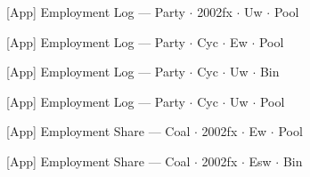 \documentclass[aspectratio=169,10pt]{beamer}
\newcommand{\tabledir}{../tables/firm}
\begin{document}
\begin{frame}[t,shrink=5]{[App] Employment Log --- Party $\cdot$ 2002fx $\cdot$ Uw $\cdot$ Pool}
\begin{center}\footnotesize

\end{center}
\end{frame}

\begin{frame}[t,shrink=5]{[App] Employment Log --- Party $\cdot$ Cyc $\cdot$ Ew $\cdot$ Pool}
\begin{center}\footnotesize

\end{center}
\end{frame}

\begin{frame}[t,shrink=5]{[App] Employment Log --- Party $\cdot$ Cyc $\cdot$ Uw $\cdot$ Bin}
\begin{center}\footnotesize

\end{center}
\end{frame}

\begin{frame}[t,shrink=5]{[App] Employment Log --- Party $\cdot$ Cyc $\cdot$ Uw $\cdot$ Pool}
\begin{center}\footnotesize

\end{center}
\end{frame}

\begin{frame}[t,shrink=5]{[App] Employment Share --- Coal $\cdot$ 2002fx $\cdot$ Ew $\cdot$ Pool}
\begin{center}\footnotesize

\end{center}
\end{frame}

\begin{frame}[t,shrink=5]{[App] Employment Share --- Coal $\cdot$ 2002fx $\cdot$ Esw $\cdot$ Bin}
\begin{center}\footnotesize

\end{center}
\end{frame}
\end{document}
